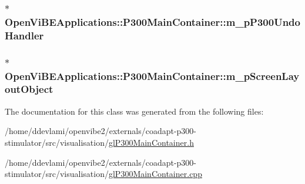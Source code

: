 \label{classOpenViBEApplications_1_1P300MainContainer_adecc9ca2fa692d9a5f4d741d08ce567c}
\hypertarget{classOpenViBEApplications_1_1P300MainContainer_ad8c503ed9ccadfd6096c0a7c462eef6e}{
\subsubsection[{m\_\-pP300UndoHandler}]{$\ast$ {\bf OpenViBEApplications::P300MainContainer::m\_\-pP300UndoHandler}}}
\label{classOpenViBEApplications_1_1P300MainContainer_ad8c503ed9ccadfd6096c0a7c462eef6e}
\hypertarget{classOpenViBEApplications_1_1P300MainContainer_a4ad545db272667dc7384daaac6866e39}{
\subsubsection[{m\_\-pScreenLayoutObject}]{$\ast$ {\bf OpenViBEApplications::P300MainContainer::m\_\-pScreenLayoutObject}}}
\label{classOpenViBEApplications_1_1P300MainContainer_a4ad545db272667dc7384daaac6866e39}


The documentation for this class was generated from the following files:\begin{DoxyCompactItemize}
\item 
/home/ddevlami/openvibe2/externals/coadapt-\/p300-\/stimulator/src/visualisation/\hyperlink{glP300MainContainer_8h}{glP300MainContainer.h}\item 
/home/ddevlami/openvibe2/externals/coadapt-\/p300-\/stimulator/src/visualisation/\hyperlink{glP300MainContainer_8cpp}{glP300MainContainer.cpp}\end{DoxyCompactItemize}
